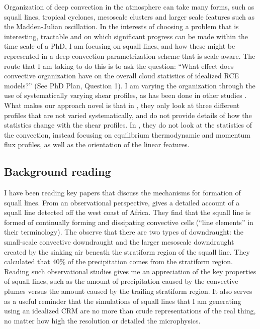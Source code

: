 \documentclass[11pt,a4paper]{article}
\begin{document}
Organization of deep convection in the atmosphere can take many forms, such as squall lines, tropical cyclones, mesoscale clusters and larger scale features such as the Madden-Julian oscillation. In the interests of choosing a problem that is interesting, tractable and on which significant progress can be made within the time scale of a PhD, I am focusing on squall lines, and how these might be represented in a deep convection parametrization scheme that is scale-aware. The route that I am taking to do this is to ask the question: ``What effect does convective organization have on the overall cloud statistics of idealized RCE models?'' (See PhD Plan, Question 1). I am varying the organization through the use of systematically varying shear profiles, as has been done in other studies \parencite{RE2001, cohen2006fluctuations}. What makes our approach novel is that in \cite{cohen2006fluctuations}, they only look at three different profiles that are not varied systematically, and do not provide details of how the statistics change with the shear profiles. In \cite{RE2001}, they do not look at the statistics of the convection, instead focusing on equilibrium thermodynamic and momentum flux profiles, as well as the orientation of the linear features. 

\subsection{Background reading}

I have been reading key papers that discuss the mechanisms for formation of squall lines. From an observational perspective, \cite{houze1977structure} gives a detailed account of a squall line detected off the west coast of Africa. They find that the squall line is formed of continually forming and dissipating convective cells (``line elements'' in their terminology). The observe that there are two types of downdraught: the small-scale convective downdraught and the larger mesoscale downdraught created by the sinking air beneath the stratiform region of the squall line. They calculated that 40\% of the precipitation comes from the stratiform region. Reading such observational studies gives me an appreciation of the key properties of squall lines, such as the amount of precipitation caused by the convective plumes versus the amount caused by the trailing stratiform region. It also serves as a useful reminder that the simulations of squall lines that I am generating using an idealized CRM are no more than crude representations of the real thing, no matter how high the resolution or detailed the microphysics.
\end{document}
